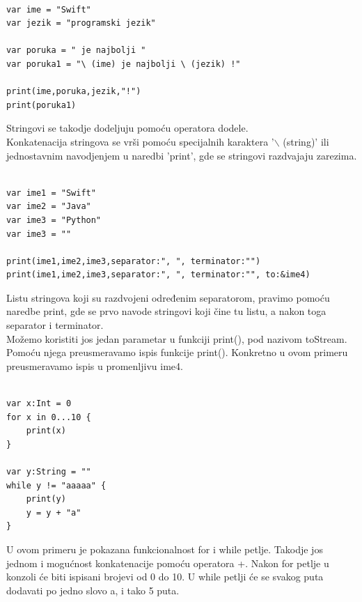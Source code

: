 \documentclass[a4paper]{article}
\begin{document}
\begin{lstlisting}[caption={},frame=single, label=simple]

var ime = "Swift"
var jezik = "programski jezik"

var poruka = " je najbolji "
var poruka1 = "\ (ime) je najbolji \ (jezik) !" 

print(ime,poruka,jezik,"!")
print(poruka1)

\end{lstlisting}

Stringovi se takodje dodeljuju pomoću operatora dodele.\\
Konkatenacija stringova se vrši pomoću specijalnih karaktera '$\backslash$ (string)' ili jednostavnim navodjenjem u naredbi 'print', gde se stringovi razdvajaju zarezima.\\



\begin{lstlisting}[caption={},frame=single, label=simple]

var ime1 = "Swift"
var ime2 = "Java"
var ime3 = "Python"
var ime3 = ""

print(ime1,ime2,ime3,separator:", ", terminator:"")
print(ime1,ime2,ime3,separator:", ", terminator:"", to:&ime4)

\end{lstlisting}

Listu stringova koji su razdvojeni određenim separatorom, pravimo pomoću naredbe print, gde se prvo navode stringovi koji čine tu listu, a nakon toga separator i terminator.\\
Možemo koristiti jos jedan parametar u funkciji print(), pod nazivom toStream. Pomoću njega preusmeravamo ispis funkcije print(). Konkretno u ovom primeru preusmeravamo ispis u promenljivu ime4.\\


\begin{lstlisting}[caption={},frame=single, label=simple]

var x:Int = 0
for x in 0...10 {
	print(x)
}

var y:String = ""
while y != "aaaaa" {
	print(y)
	y = y + "a"
}

\end{lstlisting}

U ovom primeru je pokazana funkcionalnost for i while petlje. Takodje jos jednom i mogućnost konkatenacije pomoću operatora +. Nakon for petlje u konzoli će biti ispisani brojevi od 0 do 10. U while petlji će se svakog puta dodavati po jedno slovo a, i tako 5 puta.
\end{document}
